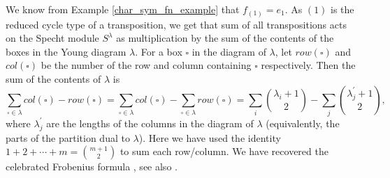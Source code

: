 \begin{example}
We know from Example \ref{char_sym_fn_example} that $f_{(1)} = e_1$. As $(1)$ is the reduced cycle type of a transposition, we get that sum of all transpositions acts on the Specht module $S^\lambda$ as multiplication by the sum of the contents of the boxes in the Young diagram $\lambda$. For a box $\square$ in the diagram of $\lambda$, let $row(\square)$ and $col(\square)$ be the number of the row and column containing $\square$ respectively. Then the sum of the contents of $\lambda$ is
\[
\sum_{\square \in \lambda} col(\square) - row(\square) = \sum_{\square \in \lambda} col(\square) - \sum_{\square \in \lambda} row(\square) = \sum_i \binom{\lambda_i +1}{2} - \sum_{j} \binom{\lambda_j^\prime +1}{2},
\]
where $\lambda_j^\prime$ are the lengths of the columns in the diagram of $\lambda$ (equivalently, the parts of the partition dual to $\lambda$). Here we have used the identity $1 + 2 + \cdots + m = \binom{m +1}{2}$ to sum each row/column. We have recovered the celebrated Frobenius formula \cite{Frobenius}, see also \cite[Example 7, Section 1.7]{Macdonald}. 
\end{example}

